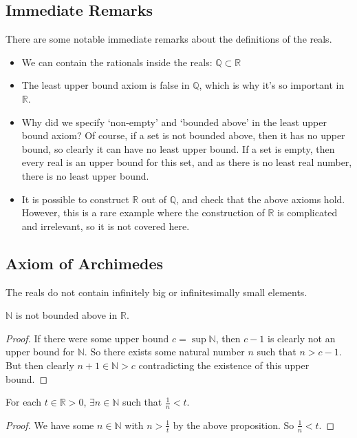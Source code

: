 \subsection{Immediate Remarks}
There are some notable immediate remarks about the definitions of the reals.
\begin{itemize}
	\item We can contain the rationals inside the reals: \(\mathbb Q \subset \mathbb R\)
	\item The least upper bound axiom is false in \(\mathbb Q\), which is why it's so important in \(\mathbb R\).
	\item Why did we specify `non-empty' and `bounded above' in the least upper bound axiom?
	      Of course, if a set is not bounded above, then it has no upper bound, so clearly it can have no least upper bound.
	      If a set is empty, then every real is an upper bound for this set, and as there is no least real number, there is no least upper bound.
	\item It is possible to construct \(\mathbb R\) out of \(\mathbb Q\), and check that the above axioms hold.
	      However, this is a rare example where the construction of \(\mathbb R\) is complicated and irrelevant, so it is not covered here.
\end{itemize}

\subsection{Axiom of Archimedes}
The reals do not contain infinitely big or infinitesimally small elements.
\begin{proposition}
	\(\mathbb N\) is not bounded above in \(\mathbb R\).
\end{proposition}
\begin{proof}
	If there were some upper bound \(c = \sup \mathbb N\), then \(c-1\) is clearly not an upper bound for \(\mathbb N\).
	So there exists some natural number \(n\) such that \(n > c-1\).
	But then clearly \(n+1 \in \mathbb N > c\) contradicting the existence of this upper bound.
\end{proof}
\begin{corollary}
	For each \(t \in \mathbb R > 0\), \(\exists n \in \mathbb N\) such that \(\frac{1}{n} < t\).
\end{corollary}
\begin{proof}
	We have some \(n \in \mathbb N\) with \(n > \frac{1}{t}\) by the above proposition.
	So \(\frac{1}{n} < t\).
\end{proof}

